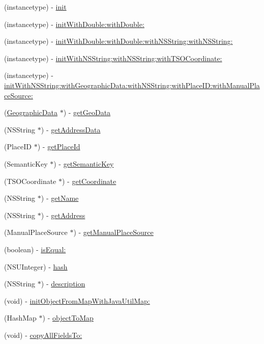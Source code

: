 \begin{DoxyCompactItemize}
\item 
(instancetype) -\/ \hyperlink{interface_t_s_o_place_a2d70a55f2505ab1e5e7ac5173b96cee4}{init}
\item 
(instancetype) -\/ \hyperlink{interface_t_s_o_place_aff6e3f45cc99785c148d3f7b70827e16}{init\+With\+Double\+:with\+Double\+:}
\item 
(instancetype) -\/ \hyperlink{interface_t_s_o_place_a6fd94d2e77ab0d150303e4eb91dcdde8}{init\+With\+Double\+:with\+Double\+:with\+N\+S\+String\+:with\+N\+S\+String\+:}
\item 
(instancetype) -\/ \hyperlink{interface_t_s_o_place_ac4204bf721a153a2a14ded3eda4f902a}{init\+With\+N\+S\+String\+:with\+N\+S\+String\+:with\+T\+S\+O\+Coordinate\+:}
\item 
(instancetype) -\/ \hyperlink{interface_t_s_o_place_a1d7838b1d7f9065e9feefc0a0f6f193a}{init\+With\+N\+S\+String\+:with\+Geographic\+Data\+:with\+N\+S\+String\+:with\+Place\+I\+D\+:with\+Manual\+Place\+Source\+:}
\item 
(\hyperlink{interface_geographic_data}{Geographic\+Data} $\ast$) -\/ \hyperlink{interface_t_s_o_place_a1bb13f15978e1ef42270d3d4071297bd}{get\+Geo\+Data}
\item 
(N\+S\+String $\ast$) -\/ \hyperlink{interface_t_s_o_place_a9b64639fd7bb833416310390017350e7}{get\+Address\+Data}
\item 
(Place\+I\+D $\ast$) -\/ \hyperlink{interface_t_s_o_place_a269a6ce4570d804727501892572ccfae}{get\+Place\+Id}
\item 
(Semantic\+Key $\ast$) -\/ \hyperlink{interface_t_s_o_place_af4992dea4126ce55879f767b896a5161}{get\+Semantic\+Key}
\item 
(T\+S\+O\+Coordinate $\ast$) -\/ \hyperlink{interface_t_s_o_place_ade705465df85e78b30fbf01132f17ff4}{get\+Coordinate}
\item 
(N\+S\+String $\ast$) -\/ \hyperlink{interface_t_s_o_place_a7e92cab63e34bcfc6f26bff0c7899816}{get\+Name}
\item 
(N\+S\+String $\ast$) -\/ \hyperlink{interface_t_s_o_place_ac1604dc10adbc7c67b83bbb977797153}{get\+Address}
\item 
(Manual\+Place\+Source $\ast$) -\/ \hyperlink{interface_t_s_o_place_aecddaeb38d95f518aa53e2e4426ad501}{get\+Manual\+Place\+Source}
\item 
(boolean) -\/ \hyperlink{interface_t_s_o_place_aaeb330df7d89598319d2949aff75c8f7}{is\+Equal\+:}
\item 
(N\+S\+U\+Integer) -\/ \hyperlink{interface_t_s_o_place_a59ffa15434c1c9604d8ecd967ac66d19}{hash}
\item 
(N\+S\+String $\ast$) -\/ \hyperlink{interface_t_s_o_place_a5b4c880b9ac7b00873accaf30da2b9af}{description}
\item 
(void) -\/ \hyperlink{interface_t_s_o_place_a0454dc5c00fa63b98eb5b4e67b432f02}{init\+Object\+From\+Map\+With\+Java\+Util\+Map\+:}
\item 
(Hash\+Map $\ast$) -\/ \hyperlink{interface_t_s_o_place_a7b2d8544ef28f7cf50e4e5bcc41a8cc2}{object\+To\+Map}
\item 
(void) -\/ \hyperlink{interface_t_s_o_place_aa5237e5ca24cf05a1e4e61d9fdbf70fe}{copy\+All\+Fields\+To\+:}
\end{DoxyCompactItemize}
